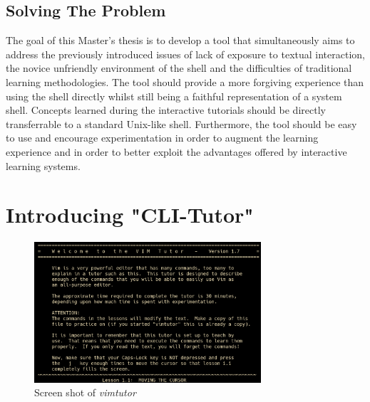 \subsection{Solving The Problem} The goal of this Master's thesis is to develop
a tool that simultaneously aims to address the previously introduced issues of
lack of exposure to textual interaction, the novice unfriendly environment of
the shell and the difficulties of traditional learning methodologies. The tool
should provide a more forgiving experience than using the shell directly whilst
still being a faithful representation of a system shell. Concepts learned
during the interactive tutorials should be directly transferrable to a standard
Unix-like shell. Furthermore, the tool should be easy to use and encourage
experimentation in order to augment the learning experience and in order to
better exploit the advantages offered by interactive learning systems.


\section{Introducing "CLI-Tutor"}
\begin{figure}[htbp]
	\centering 
	\includegraphics[width=0.75\textwidth]{img/vimtutor}
    \caption{Screen shot of \textit{vimtutor}}
	\label{fig:vimtutor}
\end{figure}


